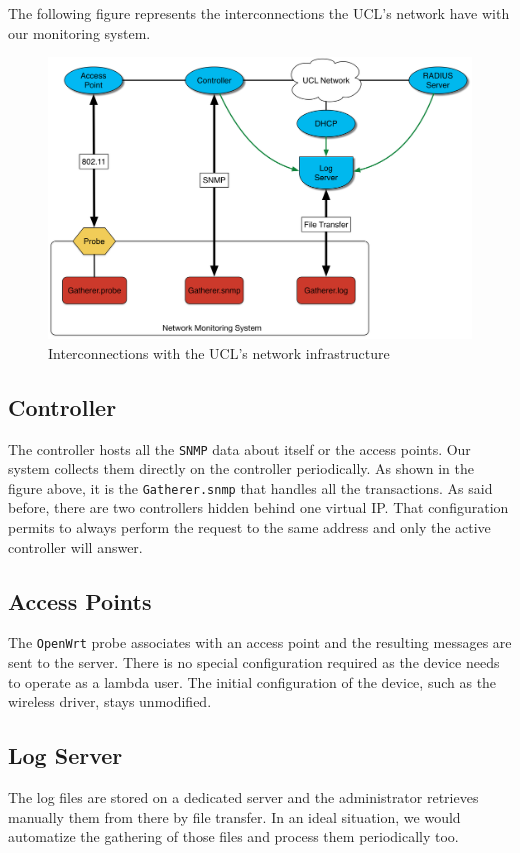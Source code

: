 The following figure represents the interconnections the UCL's network have with our monitoring system.

\begin{figure}[H]
\centering
	\includegraphics[width=.8\linewidth]{Pictures/chapter3/interactions.png}
	\caption{Interconnections with the UCL's network infrastructure}
\end{figure}


\subsection{Controller}
The controller hosts all the \texttt{SNMP} data about itself or the access points. Our system collects them directly on the controller periodically. As shown in the figure above, it is the \texttt{Gatherer.snmp} that handles all the transactions. As said before, there are two controllers hidden behind one virtual IP. That configuration permits to always perform the request to the same address and only the active controller will answer.

\subsection{Access Points}
The \texttt{OpenWrt}  probe associates with an access point and the resulting messages are sent to the server. There is no special configuration required as the device needs to operate as a lambda user. The initial configuration of the device, such as the wireless driver, stays unmodified.

\subsection{Log Server} 
The log files are stored on a dedicated server and the administrator retrieves manually them from there by file transfer. In an ideal situation, we would automatize the gathering of those files and process them periodically too.

